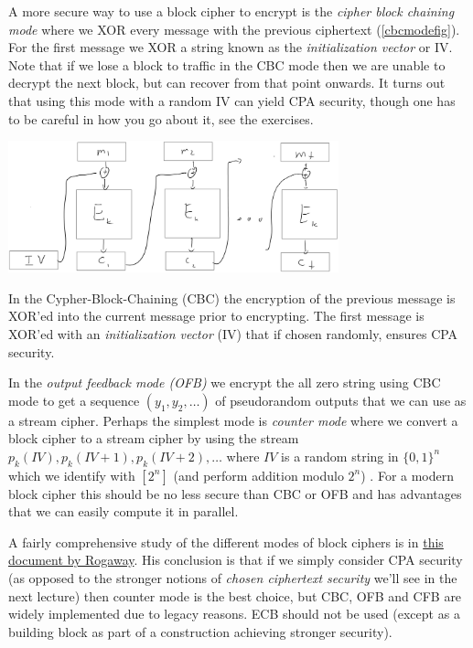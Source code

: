 A more secure way to use a block cipher to encrypt is the \emph{cipher
block chaining mode} where we XOR every message with the previous
ciphertext (\cref{cbcmodefig}). For the first message we XOR a string
known as the \emph{initialization vector} or IV. Note that if we lose a
block to traffic in the CBC mode then we are unable to decrypt the next
block, but can recover from that point onwards. It turns out that using
this mode with a random IV can yield CPA security, though one has to be
careful in how you go about it, see the exercises.


\begin{marginfigure}
\centering
\includegraphics[width=\linewidth, height=1.5in, keepaspectratio]{../figure/cbc-mode.jpg}
\caption{In the Cypher-Block-Chaining (CBC) the encryption of the
previous message is XOR'ed into the current message prior to encrypting.
The first message is XOR'ed with an \emph{initialization vector} (IV)
that if chosen randomly, ensures CPA security.}
\label{cbcmodefig}
\end{marginfigure}

In the \emph{output feedback mode (OFB)} we encrypt the all zero string
using CBC mode to get a sequence \((y_1,y_2,\ldots)\) of pseudorandom
outputs that we can use as a stream cipher. Perhaps the simplest mode is
\emph{counter mode} where we convert a block cipher to a stream cipher
by using the stream
\(p_k(\ensuremath{\mathit{IV}}),p_k(\ensuremath{\mathit{IV}}+1),p_k(\ensuremath{\mathit{IV}}+2),\ldots\)
where \(\ensuremath{\mathit{IV}}\) is a random string in \(\{0,1\}^n\)
which we identify with \([2^n]\) (and perform addition modulo \(2^n\)) .
For a modern block cipher this should be no less secure than CBC or OFB
and has advantages that we can easily compute it in parallel.

A fairly comprehensive study of the different modes of block ciphers is
in \href{http://web.cs.ucdavis.edu/~rogaway/papers/modes.pdf}{this
document by Rogaway}. His conclusion is that if we simply consider CPA
security (as opposed to the stronger notions of \emph{chosen ciphertext
security} we'll see in the next lecture) then counter mode is the best
choice, but CBC, OFB and CFB are widely implemented due to legacy
reasons. ECB should not be used (except as a building block as part of a
construction achieving stronger security).

